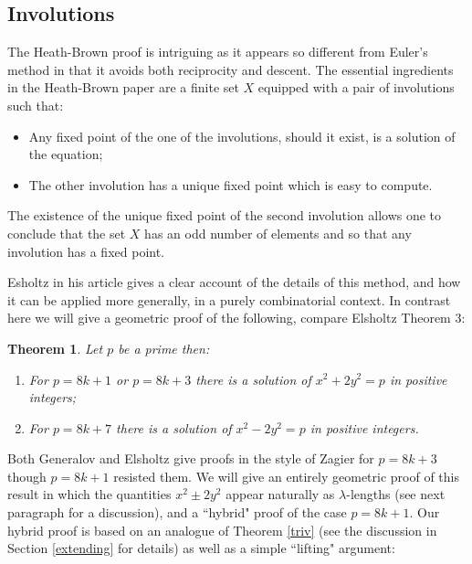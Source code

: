 \documentclass[12pt,a4paper]{amsart}
\newtheorem{thm}{Theorem}[section]
\begin{document}
\subsection{Involutions}

The Heath-Brown proof is intriguing as it appears so different from
Euler's method in that it avoids both reciprocity and descent.
The essential ingredients in the Heath-Brown paper are
a finite set $X$ equipped with a pair of involutions such that:


\begin{itemize}
	\item Any fixed point of the one of the involutions,
		should it exist, is a solution of the equation;
	\item The other involution has a unique fixed point which is easy to compute.
\end{itemize}
\noindent
The existence of the unique fixed point of the second involution
allows one to conclude that the set $X$ has an odd number of elements
and so that any involution has a fixed point.


Esholtz in his article gives a clear account of the details of this
method, and how it can be applied more generally, in a purely
combinatorial context.
In contrast here we will give a geometric proof of the following, compare Elsholtz \cite{elsholtz} Theorem 3:


\begin{thm}\label{case m equals 2}
Let $p$ be a prime then: 
\begin{enumerate}
	\item For $p =8k+1$  or $p=8k+3$ there is a solution of 
$x^2 + 2y^2 = p $
in positive integers;
	\item For $p = 8k +7$ there is a solution of $x^2 - 2y^2 = p $
in positive integers.
\end{enumerate}
\end{thm}

\noindent
Both Generalov \cite{generalov} and  Elsholtz give proofs in the
style of Zagier for $p = 8k + 3 $ 
though $p=8k+ 1$ resisted them.
We will give an entirely geometric proof of this result
in which the quantities 
$x^2 \pm 2y^2  $ appear naturally as $\lambda$-lengths
(see next paragraph for a discussion),
and a
``hybrid" proof of the  case $p=8k+1$.
Our hybrid proof is based on an analogue of Theorem \ref{triv} (see
the discussion in Section \ref{extending} for details)
as well as a simple ``lifting" argument:
\end{document}
